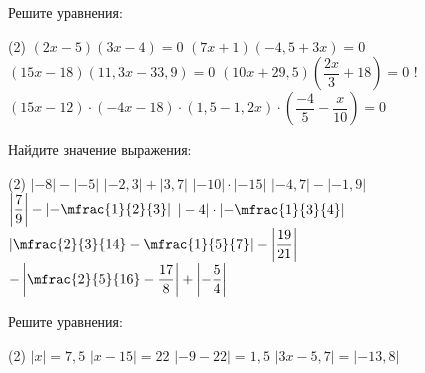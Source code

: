 \begin{homework}[number=2]
	\begin{listofex}
		\item Решите уравнения:
		\begin{tasks}(2)
			\task \( (2x-5)(3x-4)=0 \)
			\task \( (7x+1)(-4,5+3x)=0 \)
			\task \( (15x-18)(11,3x-33,9)=0 \)
			\task \( (10x+29,5)\left( \dfrac{ 2x }{ 3 } + 18 \right)=0 \)
			\task! \( (15x-12) \cdot(-4x-18) \cdot(1,5-1,2x) \cdot\left( \dfrac{ -4 }{ 5 }-\dfrac{ x }{ 10 } \right)=0 \)
		\end{tasks}
		\item Найдите значение выражения:
		\begin{tasks}(2)
			\task \( |-8|-|-5| \)
			\task \( |-2,3|+|3,7|  \)
			\task \(  |-10|\cdot|-15| \)
			\task \( |-4,7|-|-1,9| \)
			\task \( \left|\dfrac{7}{9}\right|-\left|-\mfrac{1}{2}{3}\right| \)
			\task \( |-4|\cdot\left|-\mfrac{1}{3}{4}\right| \)
			\task \( \left|\mfrac{2}{3}{14}-\mfrac{1}{5}{7}\right|-\left|\dfrac{19}{21}\right| \)
			\task \( -\left|\mfrac{2}{5}{16}-\dfrac{17}{8}\right|+\left|-\dfrac{5}{4}\right| \)
		\end{tasks}
		\item Решите уравнения:
		\begin{tasks}(2)
			\task \( |x|=7,5 \)
			\task \( |x-15|=22 \)
			\task \( |-9-22|=1,5 \)
			\task \( |3x-5,7|=|-13,8| \)
		\end{tasks}
	\end{listofex}
\end{homework}

